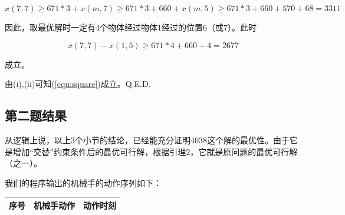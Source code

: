\documentclass{ctexart}
\begin{document}
{{\begin{enumerate}[(i)]
        	$$
        	x(7,7)\ge 671*3+x(m,7)\ge 671*3+660+x(m,5)\ge 671*3+660+570+68=3311
        	$$
        	
        	因此，取最优解时一定有4个物体经过物体1经过的位置6（或7）。此时
        	
        	$$
        	x(7, 7)-x(1, 5)\ge 671*4+660+4=2677
        	$$
  
        	成立。
        \end{enumerate}
    
        由(i),(ii)可知(\ref{equ:square})成立。Q.E.D.
        
    }

    \subsection{第二题结果}
    {
        从逻辑上说，以上3个小节的结论，已经能充分证明4038这个解的最优性。由于它是增加“交替”约束条件后的最优可行解，根据引理2，它就是原问题的最优可行解（之一）。

        我们的程序输出的机械手的动作序列如下：

        \begin{longtable}{clc}
	
            \toprule
            序号& 机械手动作& 动作时刻\\
            \midrule 
            

\end{longtable}}}
\end{document}
